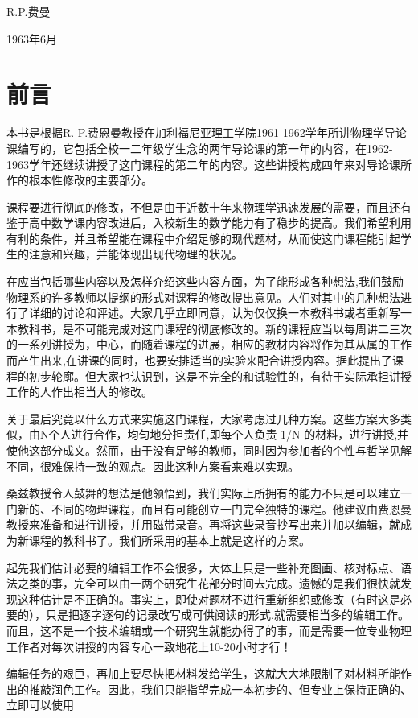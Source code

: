 \documentclass[UTF8, 12pt, a4paper, twoside]{ctexbook}
\begin{document}
\hfill R.P.费曼

\hfill 1963年6月

\chapter*{前言}

本书是根据R. P.费恩曼教授在加利福尼亚理工学院1961-1962学年所讲物理学导论课编写的，它包括全校一二年级学生念的两年导论课的第一年的内容，在1962-1963学年还继续讲授了这门课程的第二年的内容。这些讲授构成四年来对导论课所作的根本性修改的主要部分。
  
课程要进行彻底的修改，不但是由于近数十年来物理学迅速发展的需要，而且还有鉴于高中数学课内容改进后，入校新生的数学能力有了稳步的提高。我们希望利用有利的条件，并且希望能在课程中介绍足够的现代题材，从而使这门课程能引起学生的注意和兴趣，并能体现出现代物理的状况。
  
在应当包括哪些内容以及怎样介绍这些内容方面，为了能形成各种想法,我们鼓励物理系的许多教师以提纲的形式对课程的修改提出意见。人们对其中的几种想法进行了详细的讨论和评述。大家几乎立即同意，认为仅仅换一本教科书或者重新写一本教科书，是不可能完成对这门课程的彻底修改的。新的课程应当以每周讲二三次的一系列讲授为，中心，而随着课程的进展，相应的教材内容将作为其从属的工作而产生出来,在讲课的同时，也要安排适当的实验来配合讲授内容。据此提出了课程的初步轮廓。但大家也认识到，这是不完全的和试验性的，有待于实际承担讲授工作的人作出相当大的修改。
  
关于最后究竟以什么方式来实施这门课程，大家考虑过几种方案。这些方案大多类似，由N个人进行合作，均匀地分担责任,即每个人负责 1/N 的材料，进行讲授,并使他这部分成文。然而，由于没有足够的教师，同时因为参加者的个性与哲学见解不同，很难保持一致的观点。因此这种方案看来难以实现。
  
桑兹教授令人鼓舞的想法是他领悟到，我们实际上所拥有的能力不只是可以建立一门新的、不同的物理课程，而且有可能创立一门完全独特的课程。他建议由费恩曼教授来准备和进行讲授，并用磁带录音。再将这些录音抄写出来并加以编辑，就成为新课程的教科书了。我们所采用的基本上就是这样的方案。
  
起先我们估计必要的编辑工作不会很多，大体上只是一些补充图画、核对标点、语法之类的事，完全可以由一两个研究生花部分时间去完成。遗憾的是我们很快就发现这种估计是不正确的。事实上，即使对题材不进行重新组织或修改（有时这是必要的），只是把逐字逐句的记录改写成可供阅读的形式,就需要相当多的编辑工作。而且，这不是一个技术编辑或一个研究生就能办得了的事，而是需要一位专业物理工作者对每次讲授的内容专心一致地花上10-20小时才行！
  
编辑任务的艰巨，再加上要尽快把材料发给学生，这就大大地限制了对材料所能作出的推敲润色工作。因此，我们只能指望完成一本初步的、但专业上保持正确的、立即可以使用
\end{document}
